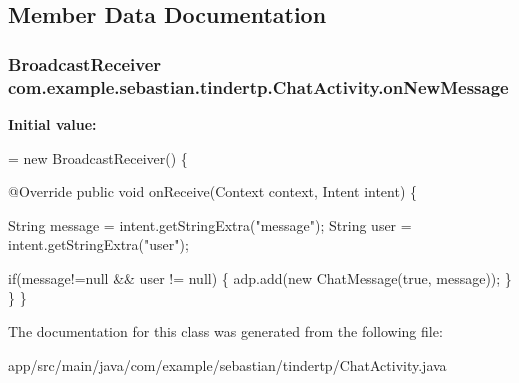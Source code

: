 \subsection{Member Data Documentation}
\subsubsection[{\texorpdfstring{on\+New\+Message}{onNewMessage}}]{\setlength{\rightskip}{0pt plus 5cm}Broadcast\+Receiver com.\+example.\+sebastian.\+tindertp.\+Chat\+Activity.\+on\+New\+Message\hspace{0.3cm}{\ttfamily [private]}}\hypertarget{classcom_1_1example_1_1sebastian_1_1tindertp_1_1ChatActivity_a69539b8bb3b8754168719adf002007b9}{}\label{classcom_1_1example_1_1sebastian_1_1tindertp_1_1ChatActivity_a69539b8bb3b8754168719adf002007b9}
{\bfseries Initial value\+:}
\begin{DoxyCode}
= \textcolor{keyword}{new} BroadcastReceiver() \{

        @Override
        \textcolor{keyword}{public} \textcolor{keywordtype}{void} onReceive(Context context, Intent intent) \{

            String message = intent.getStringExtra(\textcolor{stringliteral}{"message"});
            String user = intent.getStringExtra(\textcolor{stringliteral}{"user"});

            \textcolor{keywordflow}{if}(message!=null && user != null) \{
                adp.add(\textcolor{keyword}{new} ChatMessage(\textcolor{keyword}{true}, message));
            \}
        \}
    \}
\end{DoxyCode}


The documentation for this class was generated from the following file\+:\begin{DoxyCompactItemize}
\item 
app/src/main/java/com/example/sebastian/tindertp/Chat\+Activity.\+java\end{DoxyCompactItemize}

